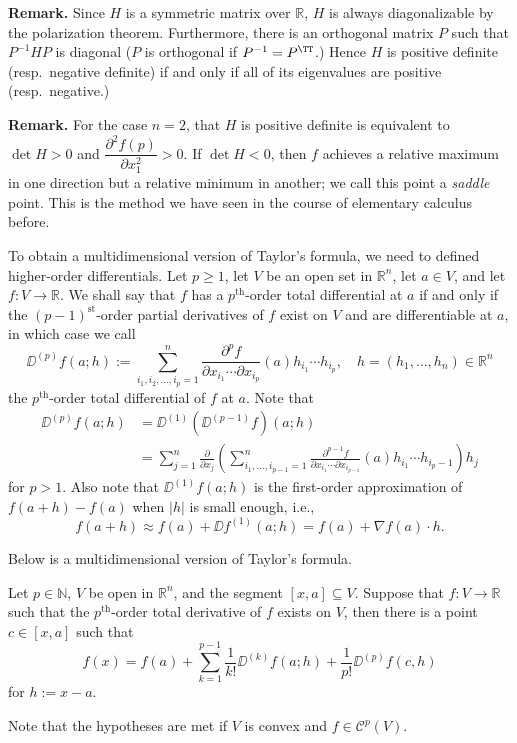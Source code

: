 \documentclass[11pt]{article}
\begin{document}
\medskip
\noindent\textbf{Remark.} Since $H$ is a symmetric matrix over $\mathbb{R}$, $H$ is always diagonalizable by the polarization theorem.  Furthermore, there is an
orthogonal matrix $P$ such that $P^{-1} H P$ is diagonal ($P$ is
orthogonal if $P^{-1} = P^\TT$.)  Hence $H$ is positive definite
(resp.~negative definite) if and only if all of its eigenvalues are
positive (resp.~negative.)  

\medskip

\noindent\textbf{Remark.} For the case $n = 2$, that $H$ is positive definite is equivalent to $\det H > 0$ and $\dfrac{\partial^2 f(p)}{\partial x_1^2} > 0$.  If $\det H < 0$, then $f$ achieves a relative maximum in one direction but a relative minimum in another; we call this point a {\em saddle\/} point.  This is the method we have seen in the course of elementary calculus before.

To obtain a multidimensional version of Taylor's formula, we need to defined higher-order differentials.
Let $p \geqslant 1$, let $V$ be an open set in $\mathbb{R}^n$, let $a \in V$, and let $f : V \to \mathbb{R}$.
We shall say that $f$ has a $p^\text{th}$-order total differential at $a$ if and only if the $(p-1)^\text{st}$-order partial derivatives of $f$ exist on $V$ and are differentiable at $a$, in which case we call
\[
  \DD^{(p)} f(a; h) := \sum_{i_1, i_2, \dots, i_p=1}^n \frac{\partial^p f}{\partial x_{i_1} \cdots \partial x_{i_p}}(a) h_{i_1} \cdots h_{i_p},
  \quad h = (h_1, \dots, h_n) \in \mathbb{R}^n
\]
the \textsf{$p^\text{th}$-order total differential} of $f$ at $a$.
Note that
\begin{align*}
  \DD^{(p)} f(a;h) &= \DD^{(1)} \left( \DD^{(p-1)} f \right) (a; h) \\
  &= \sum_{j=1}^n \frac{\partial}{\partial x_j} \left( \sum_{i_1,\dots,i_{p-1}=1}^n \frac{\partial^{p-1} f}{\partial x_{i_1} \cdots \partial x_{i_{p-1}}}(a) h_{i_1} \cdots h_{i_p-1} \right) h_j
\end{align*}
for $p > 1$.  Also note that $\DD^{(1)} f(a; h)$ is the first-order approximation of $f(a+h) - f(a)$ when $|h|$ is small enough, i.e.,
\[
  f(a+h) \approx f(a) + \DD f^{(1)}(a; h) = f(a) + \nabla f(a) \cdot h.
\]

Below is a multidimensional version of Taylor's formula.

\begin{thm}
  Let $p \in \mathbb{N}$, $V$ be open in $\mathbb{R}^n$, and the segment $[x,a] \subseteq V$.  Suppose that $f : V \to \mathbb{R}$ such that the $p^{\text{th}}$-order total derivative of $f$ exists on $V$, then there is a point $c \in [x,a]$ such that
  \[
    f(x) = f(a) + \sum_{k=1}^{p-1} \frac{1}{k!} \DD^{(k)} f(a;h) + \frac{1}{p!} \DD^{(p)} f(c,h)
  \]
  for $h := x - a$.
\end{thm}
Note that the hypotheses are met if $V$ is convex and $f \in \mathcal{C}^p(V)$.
\end{document}
